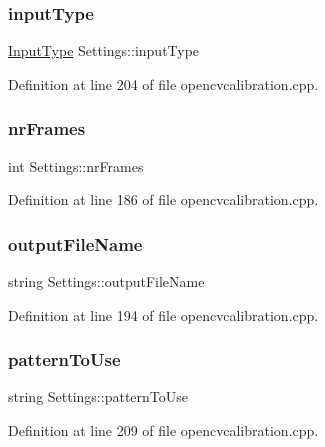 \subsubsection{\texorpdfstring{inputType}{inputType}}
{\footnotesize\ttfamily \mbox{\hyperlink{class_settings_a5afe85d24b071973a7f248c05386f7f4}{Input\+Type}} Settings\+::input\+Type}



Definition at line 204 of file opencvcalibration.\+cpp.

\mbox{\label{class_settings_a7e6654cd0e51791ed687eaa85f8fc143}} 
\subsubsection{\texorpdfstring{nrFrames}{nrFrames}}
{\footnotesize\ttfamily int Settings\+::nr\+Frames}



Definition at line 186 of file opencvcalibration.\+cpp.

\mbox{\label{class_settings_a9468f1ad53e982f9541d76c8d3228900}} 
\subsubsection{\texorpdfstring{outputFileName}{outputFileName}}
{\footnotesize\ttfamily string Settings\+::output\+File\+Name}



Definition at line 194 of file opencvcalibration.\+cpp.

\mbox{\label{class_settings_ae8df4a531058c0dc6b544aff531e55ef}} 
\subsubsection{\texorpdfstring{patternToUse}{patternToUse}}
{\footnotesize\ttfamily string Settings\+::pattern\+To\+Use\hspace{0.3cm}{\ttfamily [private]}}



Definition at line 209 of file opencvcalibration.\+cpp.

